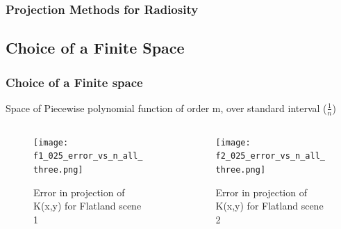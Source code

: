     \begin{frame}\frametitle{Projection Methods for Radiosity}

    \end{frame}








\subsection{Choice of a Finite Space}
    \begin{frame}\frametitle{Choice of a Finite space}
        
      Space of Piecewise polynomial function of order m, over standard interval ($\frac{1}{n}$)
      \begin{columns}[T]
         \begin{column}{.5\textwidth}
      
            \begin{figure}
            \centering
            \texttt{[image: f1\_025\_error\_vs\_n\_all\_three.png]}
            \caption{Error in projection of K(x,y) for Flatland scene 1}
            \label{fig_e_vs_n_f1}
            \end{figure}
        \end{column}
         \begin{column}{.5\textwidth}

            \begin{figure}
            \centering
            \texttt{[image: f2\_025\_error\_vs\_n\_all\_three.png]}
            \caption{Error in projection of K(x,y) for Flatland scene 2}
            \label{fig_e_vs_n_f2}
            \end{figure}
        \end{column}
        \end{columns}
\end{frame}





